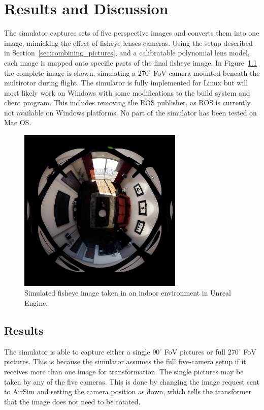 
\chapter{Results and Discussion}

The simulator captures sets of five perspective images and converts them into one image, mimicking the effect of fisheye lenses cameras. Using the setup described in Section~\ref{sec:combining_pictures}, and a calibratable polynomial lens model, each image is mapped onto specific parts of the final fisheye image. In Figure~\ref{fig:res_show_fisheye} the complete image is shown, simulating a $270^\circ$ FoV camera mounted beneath the multirotor during flight. The simulator is fully implemented for Linux but will most likely work on Windows with some modifications to the build system and client program. This includes removing the ROS publisher, as ROS is currently not available on Windows platforms. No part of the simulator has been tested on Mac OS. 

\begin{figure}[!htb]
    \centering
    \includegraphics[width=0.7\textwidth]{rapport/fig/Results/1024to1024.jpeg}
    \caption{Simulated fisheye image taken in an indoor environment in Unreal Engine.}
    \label{fig:res_show_fisheye}
\end{figure}

\section{Results} \label{sec:Results}

The simulator is able to capture either a single $90^\circ$ FoV pictures or full $270^\circ$ FoV pictures. This is because the simulator assumes the full five-camera setup if it receives more than one image for transformation. The single pictures may be taken by any of the five cameras. This is done by changing the image request sent to AirSim and setting the camera position as down, which tells the transformer that the image does not need to be rotated.

